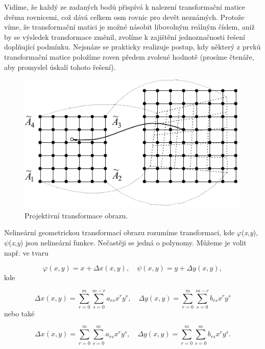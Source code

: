 Vidíme, že každý ze zadaných bodů přispívá k nalezení transformační matice dvěma rovnicemi, což dává celkem osm rovnic pro devět neznámých. Protože víme, že transformační matici je možné násobit libovolným reálným číslem, aniž by se výsledek transformace změnil, zvolíme k zajištění jednoznačnosti řešení doplňující podmínku. Nejsnáze se prakticky realizuje postup, kdy některý z prvků transformační matice položíme roven předem zvolené hodnotě (prosíme čtenáře, aby promyslel úskalí tohoto řešení).

\begin{figure}[th]
    \begin{center}
        \includegraphics[scale=1.0]{06_bodoveoperace/images/img_6_7.pdf}
    \end{center}
    \caption{Projektivní transformace obrazu.}
    \label{img:6_7}
\end{figure}

Nelineární geometrickou transformací obrazu rozumíme transformaci, kde $\varphi$(\textit{x},\textit{y}), $\psi$(\textit{x},\textit{y}) jsou nelineární funkce. Nečastěji se jedná o polynomy. Můžeme je volit např. ve tvaru

\begin{equation} \label{eq:6_27}
    \varphi \left(x,y\right)=x+\Delta x\left(x,y\right), \quad \psi \left(x,y\right)=y+\Delta y\left(x,y\right),
\end{equation}
kde

\begin{equation} \label{eq:6_28}
    \Delta x\left(x,y\right)=\sum _{r=0}^{m}\sum _{s=0}^{m-r}a_{rs} x^{r} y^{s}, \quad \Delta y\left(x,y\right)=\sum _{r=0}^{m}\sum _{s=0}^{m-r}b_{rs} x^{r} y^{s}
\end{equation}
nebo také

\begin{equation} \label{eq:6_29}
    \Delta x\left(x,y\right)=\sum _{r=0}^{m}\sum _{s=0}^{m}a_{rs} x^{r} y^{s}, \quad \Delta y\left(x,y\right)=\sum _{r=0}^{m}\sum _{s=0}^{m}b_{rs} x^{r} y^{s}.
\end{equation}

